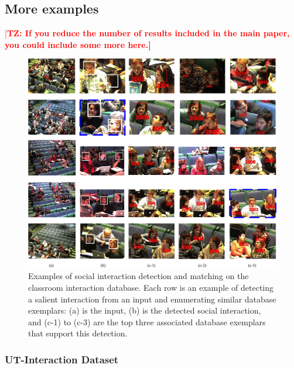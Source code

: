 \documentclass[10pt,twocolumn,letterpaper]{article}
\newcommand{\todd}[1]{\textcolor{red}{[\bf TZ: #1]}}
\begin{document}
\subsection{More examples}

\todd{If you reduce the number of results included in the main paper, you could include some more here.}

\begin{figure}
\begin{center}
\includegraphics[scale=2.25]{retrieved.png}
\end{center}
\vspace{-10pt}
\caption{Examples of social interaction detection and matching on the classroom interaction database. Each row is an example of detecting a salient interaction from an input and enumerating similar database exemplars: (a) is the input, (b) is the detected social interaction, and (c-1) to (c-3) are the top three associated database exemplars that support this detection.}
\label{retrieved}
\end{figure}

\subsubsection{UT-Interaction Dataset}
\end{document}
